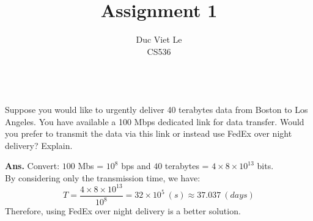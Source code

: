 \documentclass[12pt]{article}
\newenvironment{problem}[2][Problem]{\begin{trivlist}
\item[\hskip \labelsep {\bfseries #1}\hskip \labelsep {\bfseries #2.}]}{\end{trivlist}}
\begin{document}
 
\title{Assignment 1}
\author{Duc Viet Le\\
 CS536}
 
\maketitle
 
\begin{problem}{1} \ \\
Suppose you would like to urgently deliver 40 terabytes data from Boston to Los Angeles. You
have available a 100 Mbps dedicated link for data transfer. Would you prefer to transmit the
data via this link or instead use FedEx over night delivery? Explain.
\end{problem}
\textbf{Ans. } Convert: $100$ Mbs = $10^8$ bps and $40$ terabytes = $4 \times 8 \times 10^{13}$ bits.
\\ By considering only the transmission time, we have: 
$$T = \frac{4 \times 8 \times 10^{13} } {10^8} = 32 \times 10^5\ (s) \approx 37.037\ (days)$$
Therefore, using FedEx over night delivery is a better solution. 	
\end{document}
